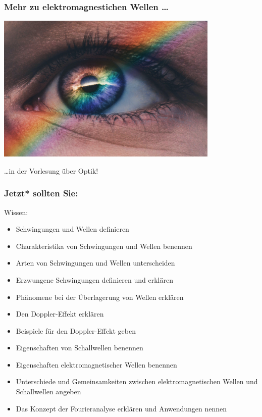 \documentclass{beamer}
\begin{document}
\begin{frame}
\frametitle{Mehr zu elektromagnestichen Wellen \dots}


\begin{center}
\includegraphics[width=0.8\textwidth]{rainbow_eye.jpg}
\end{center}

\dots in der Vorlesung über Optik!


\end{frame}





\begin{frame}

\frametitle{Jetzt* sollten Sie:}

\begin{block}{Wissen:}
\begin{itemize}
\item
Schwingungen und Wellen definieren
\item
Charakteristika von Schwingungen und Wellen benennen 
\item
Arten von Schwingungen und Wellen unterscheiden
\item
Erzwungene Schwingungen definieren und erklären
\item
Phänomene bei der Überlagerung von Wellen erklären
\item
Den Doppler-Effekt erklären
\item
Beispiele für den Doppler-Effekt geben
\item
Eigenschaften von Schallwellen benennen
\item
Eigenschaften elektromagnetischer Wellen benennen
\item
Unterschiede und Gemeinsamkeiten zwischen elektromagnetischen Wellen und Schallwellen angeben
\item
Das Konzept der Fourieranalyse erklären und Anwendungen nennen
\end{itemize} 

\end{block}

\end{frame}
\end{document}

